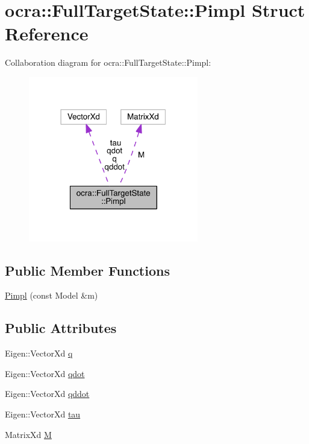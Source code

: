 \hypertarget{structocra_1_1FullTargetState_1_1Pimpl}{}\section{ocra\+:\+:Full\+Target\+State\+:\+:Pimpl Struct Reference}
\label{structocra_1_1FullTargetState_1_1Pimpl}


Collaboration diagram for ocra\+:\+:Full\+Target\+State\+:\+:Pimpl\+:\nopagebreak
\begin{figure}[H]
\begin{center}
\leavevmode
\includegraphics[width=210pt]{d2/dac/structocra_1_1FullTargetState_1_1Pimpl__coll__graph}
\end{center}
\end{figure}
\subsection*{Public Member Functions}
\begin{DoxyCompactItemize}
\item 
\hyperlink{structocra_1_1FullTargetState_1_1Pimpl_abf41bdded179528f89726ae9071f1377}{Pimpl} (const Model \&m)
\end{DoxyCompactItemize}
\subsection*{Public Attributes}
\begin{DoxyCompactItemize}
\item 
Eigen\+::\+Vector\+Xd \hyperlink{structocra_1_1FullTargetState_1_1Pimpl_afb9abfe35480d2dea95ed9d54e8906df}{q}
\item 
Eigen\+::\+Vector\+Xd \hyperlink{structocra_1_1FullTargetState_1_1Pimpl_a2d1307a89fa37ddb50305785e7d91e68}{qdot}
\item 
Eigen\+::\+Vector\+Xd \hyperlink{structocra_1_1FullTargetState_1_1Pimpl_a6eb86dcb00ed58935f11c42f030645a3}{qddot}
\item 
Eigen\+::\+Vector\+Xd \hyperlink{structocra_1_1FullTargetState_1_1Pimpl_aae33a52895f1ead1be869d88b3e6ff9f}{tau}
\item 
Matrix\+Xd \hyperlink{structocra_1_1FullTargetState_1_1Pimpl_aaf42a0f7ecf1e3750695edc06fb06c11}{M}
\end{DoxyCompactItemize}


